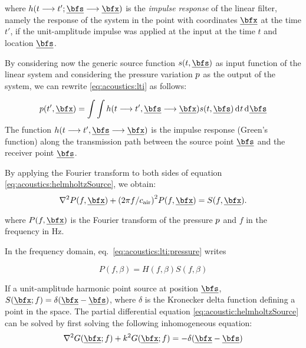 where $h(t \kto  t' ; \positionSource \kto \positionMicrophone)$ is the \textit{impulse response} of the linear filter, namely the response of the system
in the point with coordinates $\positionMicrophone$ at the time $t'$, if the unit-amplitude impulse was applied at the input at the time $t$ and location $\positionSource$.

By considering now the generic source function $s(t, \positionSource)$ as input function of the linear system and considering the pressure variation $p$ as the output of the system,
we can rewrite \cref{eq:acoustics:lti} as follows:

\begin{equation}
    \label{eq:acoustics:lti:pressure}
    p(t', \positionMicrophone) =
    \int \int
        h(t \kto  t', \positionSource \kto \positionMicrophone)
        s(t, \positionSource)
        \kdiff t  \kdiff \positionSource
\end{equation}
The function $h(t \kto  t', \positionSource \kto \positionMicrophone)$ is the impulse response (Green's function)
along the transmission path between the source point $\positionSource$ and the receiver point $\positionSource$.

By applying the Fourier transform to both sides of equation \cref{eq:acoustics:helmholtzSource}, we obtain:
\begin{equation}
    \label{eq:acoustics:helmholtzSource}
    \knabla^2 P(f, \positionMicrophone) + \kparen{2 \pi f / \cair}^2 P(f, \positionMicrophone) = S(f, \positionMicrophone).
\end{equation}

where  $P(f, \positionMicrophone)$ is the Fourier transform of the pressure $p$ and $f$ in the frequency in $\si{\hertz}$.

In the frequency domain, eq.~\cref{eq:acoustics:lti:pressure} writes

\begin{equation}
    P(f, \beta) = H(f, \beta) S(f, \beta)
\end{equation}


If a unit-amplitude harmonic point source at position $\positionSource$, $S(\positionMicrophone ; f) = \delta(\positionMicrophone - \positionSource)$,
where $\delta$ is the Kronecker delta function defining a point in the space.
The partial differential equation \cref{eq:acoustic:helmholtzSource} can be solved by first solving the following inhomogeneous equation:
\begin{equation}
    \knabla^2 G(\positionMicrophone ; f) + k^2 G(\positionMicrophone ; f) = - \delta(\positionMicrophone - \positionSource)
\end{equation}

